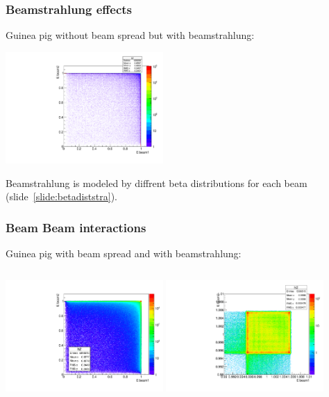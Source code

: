 \documentclass{beamer}
\begin{document}
\begin{frame}
\frametitle{Beamstrahlung effects}
Guinea pig \alert{without} beam spread but \alert{with} beamstrahlung:\\
\begin{center}
\includegraphics[width=6cm]{E1_E2_nospread_with_strahlung.pdf}
\end{center}
Beamstrahlung is modeled by diffrent beta distributions for each beam
(slide~\ref{slide:betadiststra}).
\end{frame}

\begin{frame}
\frametitle{Beam Beam interactions}
Guinea pig \alert{with} beam spread and \alert{with} beamstrahlung:\\
\begin{columns}[c]
\column{6cm}
\includegraphics[width=6cm]{E1_E2_spread_strahlung.pdf}
\column{6cm}
\includegraphics[width=6cm]{E1_E2_spread_strahlung_zoom.pdf}
\end{columns}
\end{frame}
\end{document}
